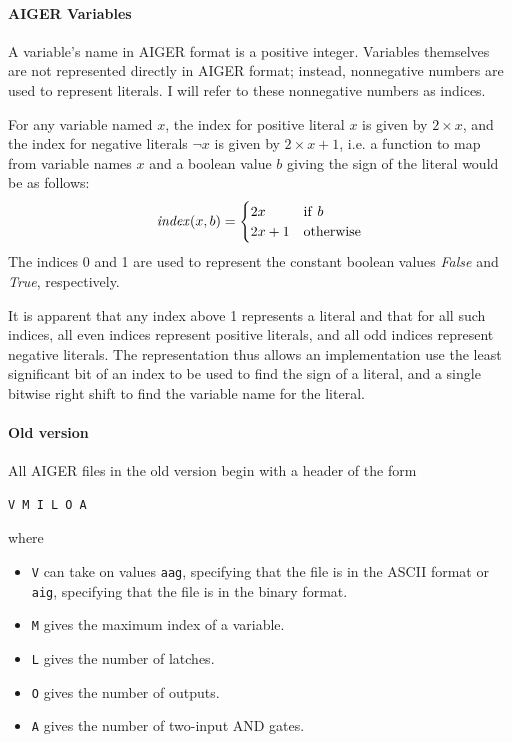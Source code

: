 \documentclass[12pt,a4paper,twoside,openright]{report}
\begin{document}
\paragraph{AIGER Variables}{
A variable's name in AIGER format is a positive integer. Variables themselves
are not represented directly in AIGER format; instead, nonnegative numbers
are used to represent literals.
I will refer to these nonnegative numbers as indices.

For any variable named $x$, the index for positive literal $x$ is given by
$2 \times x$, and the index for negative literals $\neg x$ is given by
$2 \times x + 1$, i.e. a function to map from variable names $x$ and a boolean
value $b$ giving the sign of the literal would be as follows:
$${\it index}(x, b) =
\begin{cases}
2x & {\rm if}~b \\
2x + 1 & {\rm otherwise}
\end{cases}$$
The indices 0 and 1 are used to represent the constant boolean values {\it False}
and {\it True}, respectively.

It is apparent that any index above 1 represents a literal and that for all such
indices, all even indices represent positive literals, and all odd indices
represent negative literals. The representation thus allows an implementation
use the least significant bit of an index to be used to find the sign of a literal,
and a single bitwise right shift to find the variable name for the literal.

\paragraph{Old version}{
All AIGER files in the old version begin with a header of the form
\begin{verbatim}
V M I L O A
\end{verbatim}
where
\begin{itemize}
\item \verb,V, can take on values \verb,aag,, specifying that the file is in the ASCII format or \verb,aig,,
specifying that the file is in the binary format.
\item \verb,M, gives the maximum index of a variable.
\item \verb,L, gives the number of latches.
\item \verb,O, gives the number of outputs.
\item \verb,A, gives the number of two-input AND gates.
\end{itemize}

}}
\end{document}
